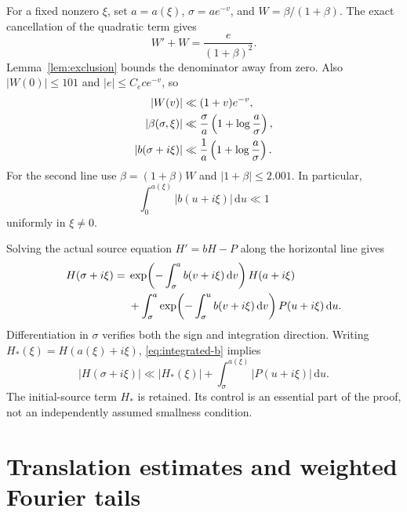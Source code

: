 \documentclass[11pt,letterpaper]{article}
\numberwithin{equation}{section}
\theoremstyle{definition}
\theoremstyle{remark}
\newcommand{\dd}{\,\mathrm d}
\begin{document}
For a fixed nonzero $\xi$, set $a=a(\xi)$, $\sigma=ae^{-v}$, and
$W=\beta/(1+\beta)$. The exact cancellation of the quadratic term gives
\begin{equation}\label{eq:W}
 W'+W=\frac{e}{(1+\beta)^2}.
\end{equation}
Lemma~\ref{lem:exclusion} bounds the denominator away from zero.
Also $|W(0)|\le101$ and $|e|\le C_e c e^{-v}$, so
\begin{align}
 |W(v)|&\ll(1+v)e^{-v},\notag\\
 |\beta(\sigma,\xi)|&\ll\frac\sigma a\left(1+\log\frac a\sigma\right),
 \label{eq:beta-decay}\\
 |b(\sigma+i\xi)|&\ll\frac1a\left(1+\log\frac a\sigma\right).
 \label{eq:b-decay}
\end{align}
For the second line use $\beta=(1+\beta)W$ and $|1+\beta|\le2.001$.
In particular,
\begin{equation}\label{eq:integrated-b}
 \int_0^{a(\xi)}|b(u+i\xi)|\dd u\ll1
\end{equation}
uniformly in $\xi\ne0$.

Solving the actual source equation $H'=bH-P$ along the horizontal line
gives
\begin{align}
 H(\sigma+i\xi)
 ={}&\exp\!\left(-\int_\sigma^a b(v+i\xi)\dd v\right)H(a+i\xi)
 \notag\\
 &+\int_\sigma^a
  \exp\!\left(-\int_\sigma^u b(v+i\xi)\dd v\right)P(u+i\xi)\dd u.
 \label{eq:source-formula}
\end{align}
Differentiation in $\sigma$ verifies both the sign and integration direction.
Writing $H_*(\xi)=H(a(\xi)+i\xi)$, \eqref{eq:integrated-b} implies
\begin{equation}\label{eq:source-bound}
 |H(\sigma+i\xi)|\ll |H_*(\xi)|+
              \int_\sigma^{a(\xi)}|P(u+i\xi)|\dd u.
\end{equation}
The initial-source term $H_*$ is retained. Its control is an essential part
of the proof, not an independently assumed smallness condition.

\section{Translation estimates and weighted Fourier tails}\label{sec:tails}
\end{document}
